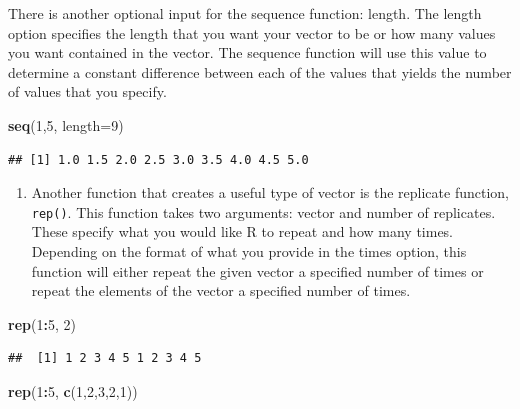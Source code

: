 \documentclass[
]{book}
\newenvironment{Shaded}{\begin{snugshade}}{\end{snugshade}}
\newcommand{\AttributeTok}[1]{\textcolor[rgb]{0.13,0.29,0.53}{#1}}
\newcommand{\DecValTok}[1]{\textcolor[rgb]{0.00,0.00,0.81}{#1}}
\newcommand{\FunctionTok}[1]{\textcolor[rgb]{0.13,0.29,0.53}{\textbf{#1}}}
\newcommand{\NormalTok}[1]{#1}
\newcommand{\SpecialCharTok}[1]{\textcolor[rgb]{0.81,0.36,0.00}{\textbf{#1}}}
\providecommand{\tightlist}{%
  \setlength{\itemsep}{0pt}\setlength{\parskip}{0pt}}
\theoremstyle{definition}
\theoremstyle{definition}
\theoremstyle{definition}
\theoremstyle{definition}
\theoremstyle{remark}
\begin{document}
There is another optional input for the sequence function: length. The length option specifies the length that you want your vector to be or how many values you want contained in the vector. The sequence function will use this value to determine a constant difference between each of the values that yields the number of values that you specify.

\begin{Shaded}
\begin{Highlighting}[]
\FunctionTok{seq}\NormalTok{(}\DecValTok{1}\NormalTok{,}\DecValTok{5}\NormalTok{, }\AttributeTok{length=}\DecValTok{9}\NormalTok{)}
\end{Highlighting}
\end{Shaded}

\begin{verbatim}
## [1] 1.0 1.5 2.0 2.5 3.0 3.5 4.0 4.5 5.0
\end{verbatim}

\begin{enumerate}
\def\labelenumi{\arabic{enumi}.}
\setcounter{enumi}{2}
\tightlist
\item
  Another function that creates a useful type of vector is the replicate function, \texttt{rep()}. This function takes two arguments: vector and number of replicates. These specify what you would like R to repeat and how many times. Depending on the format of what you provide in the times option, this function will either repeat the given vector a specified number of times or repeat the elements of the vector a specified number of times.
\end{enumerate}

\begin{Shaded}
\begin{Highlighting}[]
\FunctionTok{rep}\NormalTok{(}\DecValTok{1}\SpecialCharTok{:}\DecValTok{5}\NormalTok{, }\DecValTok{2}\NormalTok{)}
\end{Highlighting}
\end{Shaded}

\begin{verbatim}
##  [1] 1 2 3 4 5 1 2 3 4 5
\end{verbatim}

\begin{Shaded}
\begin{Highlighting}[]
\FunctionTok{rep}\NormalTok{(}\DecValTok{1}\SpecialCharTok{:}\DecValTok{5}\NormalTok{, }\FunctionTok{c}\NormalTok{(}\DecValTok{1}\NormalTok{,}\DecValTok{2}\NormalTok{,}\DecValTok{3}\NormalTok{,}\DecValTok{2}\NormalTok{,}\DecValTok{1}\NormalTok{))}
\end{Highlighting}
\end{Shaded}
\end{document}
